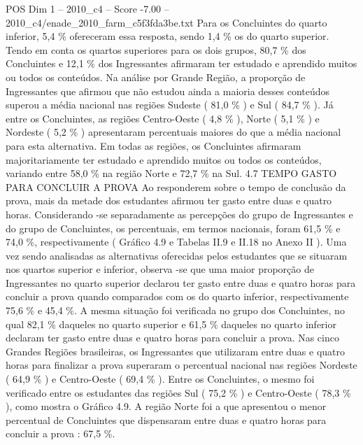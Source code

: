 \begin{textsample}{POS Dim 1 – 2010\_c4 – Score -7.00 – 2010\_c4/enade\_2010\_farm\_c5f3fda3be.txt}
Para os Concluintes do quarto inferior, 5,4 \% ofereceram essa resposta, sendo 1,4 \% os do quarto superior.
Tendo em conta os quartos superiores para os dois grupos, 80,7 \% dos Concluintes e 12,1 \% dos Ingressantes afirmaram ter estudado e aprendido muitos ou todos os conteúdos.
Na análise por Grande Região, a proporção de Ingressantes que afirmou que não estudou ainda a maioria desses conteúdos superou a média nacional nas regiões Sudeste ( 81,0 \% ) e Sul ( 84,7 \% ).
Já entre os Concluintes, as regiões Centro-Oeste ( 4,8 \% ), Norte ( 5,1 \% ) e Nordeste ( 5,2 \% ) apresentaram percentuais maiores do que a média nacional para esta alternativa.
Em todas as regiões, os Concluintes afirmaram majoritariamente ter estudado e aprendido muitos ou todos os conteúdos, variando entre 58,0 \% na região Norte e 72,7 \% na Sul. 4.7 TEMPO GASTO PARA CONCLUIR A PROVA Ao responderem sobre o tempo de conclusão da prova, mais da metade dos estudantes afirmou ter gasto entre duas e quatro horas.
Considerando -se separadamente as percepções do grupo de Ingressantes e do grupo de Concluintes, os percentuais, em termos nacionais, foram 61,5 \% e 74,0 \%, respectivamente ( Gráfico 4.9 e Tabelas II.9 e II.18 no Anexo II ).
Uma vez sendo analisadas as alternativas oferecidas pelos estudantes que se situaram nos quartos superior e inferior, observa -se que uma maior proporção de Ingressantes no quarto superior declarou ter gasto entre duas e quatro horas para concluir a prova quando comparados com os do quarto inferior, respectivamente 75,6 \% e 45,4 \%.
A mesma situação foi verificada no grupo dos Concluintes, no qual 82,1 \% daqueles no quarto superior e 61,5 \% daqueles no quarto inferior declaram ter gasto entre duas e quatro horas para concluir a prova.
Nas cinco Grandes Regiões brasileiras, os Ingressantes que utilizaram entre duas e quatro horas para finalizar a prova superaram o percentual nacional nas regiões Nordeste ( 64,9 \% ) e Centro-Oeste ( 69,4 \% ).
Entre os Concluintes, o mesmo foi verificado entre os estudantes das regiões Sul ( 75,2 \% ) e Centro-Oeste ( 78,3 \% ), como mostra o Gráfico 4.9.
A região Norte foi a que apresentou o menor percentual de Concluintes que dispensaram entre duas e quatro horas para concluir a prova : 67,5 \%.

\end{textsample}
